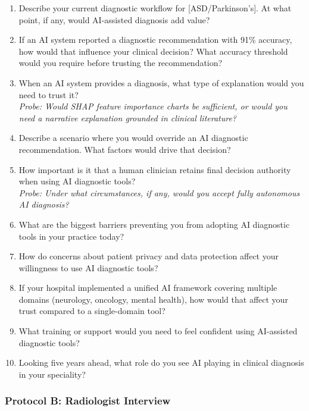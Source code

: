 \begin{enumerate}[label=\textbf{CL\arabic*.}, leftmargin=2cm]
    \item Describe your current diagnostic workflow for [ASD/Parkinson's]. At what point, if any, would AI-assisted diagnosis add value?
    \item If an AI system reported a diagnostic recommendation with 91\% accuracy, how would that influence your clinical decision? What accuracy threshold would you require before trusting the recommendation?
    \item When an AI system provides a diagnosis, what type of explanation would you need to trust it? \\
    \textit{Probe: Would SHAP feature importance charts be sufficient, or would you need a narrative explanation grounded in clinical literature?}
    \item Describe a scenario where you would override an AI diagnostic recommendation. What factors would drive that decision?
    \item How important is it that a human clinician retains final decision authority when using AI diagnostic tools? \\
    \textit{Probe: Under what circumstances, if any, would you accept fully autonomous AI diagnosis?}
    \item What are the biggest barriers preventing you from adopting AI diagnostic tools in your practice today?
    \item How do concerns about patient privacy and data protection affect your willingness to use AI diagnostic tools?
    \item If your hospital implemented a unified AI framework covering multiple domains (neurology, oncology, mental health), how would that affect your trust compared to a single-domain tool?
    \item What training or support would you need to feel confident using AI-assisted diagnostic tools?
    \item Looking five years ahead, what role do you see AI playing in clinical diagnosis in your speciality?
\end{enumerate}

\subsubsection{Protocol B: Radiologist Interview}

